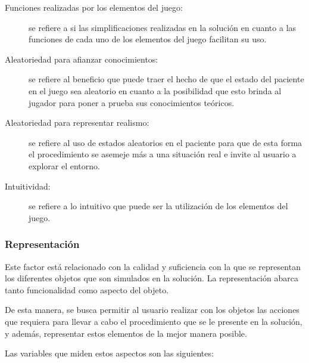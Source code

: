 \begin{description}



\item[Funciones realizadas por los elementos del juego:] se refiere a si las 
	simplificaciones realizadas en la solución en cuanto a las funciones de cada uno 
	de los elementos del juego facilitan su uso.


\item[Aleatoriedad para afianzar conocimientos:] se refiere al beneficio que
    puede traer el hecho de que el estado del paciente en el juego sea aleatorio
    en cuanto a la posibilidad que esto brinda al jugador para poner a prueba
    sus conocimientos teóricos.

\item[Aleatoriedad para representar realismo:] se refiere al uso de estados
    aleatorios en el paciente para que de esta forma el procedimiento se asemeje
    más a una situación real e invite al usuario a explorar el entorno.

\item[Intuitividad:] se refiere a lo intuitivo que puede ser la
    utilización de los elementos del juego.

\end{description}

\subsubsection{Representación}
\label{sec:sub_representacion}

Este factor está relacionado con la calidad y suficiencia con la que se
representan los diferentes objetos que son simulados en la solución. La
representación abarca tanto funcionalidad como aspecto del objeto.

De esta manera, se busca permitir al usuario realizar con los objetos las
acciones que requiera para llevar a cabo el procedimiento que se le presente en
la solución, y además, representar estos elementos de la mejor manera posible.

Las variables que miden estos aspectos son las siguientes:

